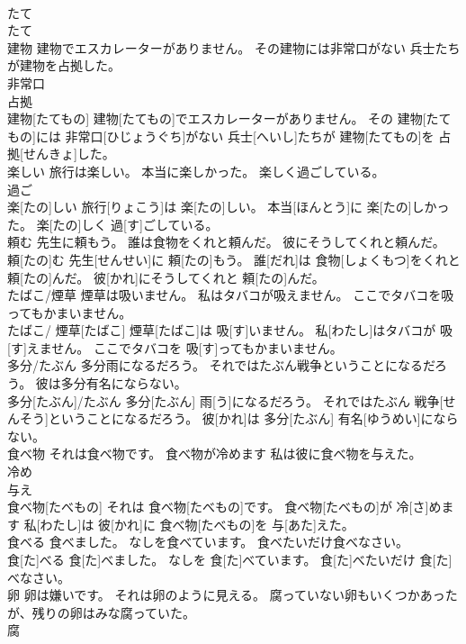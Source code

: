 \documentclass[8pt]{extreport}
\begin{document}
\begin{CJK}{UTF8}{min}
\\	たて	
\\	たて
\\	建物 建物でエスカレーターがありません。 その建物には非常口がない 兵士たちが建物を占拠した。	
\\	非常口 
\\	占拠 
\\	建物[たてもの] 建物[たてもの]でエスカレーターがありません。 その 建物[たてもの]には 非常口[ひじょうぐち]がない 兵士[へいし]たちが 建物[たてもの]を 占拠[せんきょ]した。
\\	楽しい 旅行は楽しい。 本当に楽しかった。 楽しく過ごしている。	
\\	過ご 
\\	楽[たの]しい 旅行[りょこう]は 楽[たの]しい。 本当[ほんとう]に 楽[たの]しかった。 楽[たの]しく 過[す]ごしている。
\\	頼む 先生に頼もう。 誰は食物をくれと頼んだ。 彼にそうしてくれと頼んだ。	
\\	頼[たの]む 先生[せんせい]に 頼[たの]もう。 誰[だれ]は 食物[しょくもつ]をくれと 頼[たの]んだ。 彼[かれ]にそうしてくれと 頼[たの]んだ。
\\	たばこ/煙草 煙草は吸いません。 私はタバコが吸えません。 ここでタバコを吸ってもかまいません。	
\\	たばこ/ 煙草[たばこ] 煙草[たばこ]は 吸[す]いません。 私[わたし]はタバコが 吸[す]えません。 ここでタバコを 吸[す]ってもかまいません。
\\	多分/たぶん 多分雨になるだろう。 それではたぶん戦争ということになるだろう。 彼は多分有名にならない。	
\\	多分[たぶん]/たぶん 多分[たぶん] 雨[う]になるだろう。 それではたぶん 戦争[せんそう]ということになるだろう。 彼[かれ]は 多分[たぶん] 有名[ゆうめい]にならない。
\\	食べ物 それは食べ物です。 食べ物が冷めます 私は彼に食べ物を与えた。	
\\	冷め 
\\	与え 
\\	食べ物[たべもの] それは 食べ物[たべもの]です。 食べ物[たべもの]が 冷[さ]めます 私[わたし]は 彼[かれ]に 食べ物[たべもの]を 与[あた]えた。
\\	食べる 食べました。 なしを食べています。 食べたいだけ食べなさい。	
\\	食[た]べる 食[た]べました。 なしを 食[た]べています。 食[た]べたいだけ 食[た]べなさい。
\\	卵 卵は嫌いです。 それは卵のように見える。 腐っていない卵もいくつかあったが、残りの卵はみな腐っていた。	
\\	腐 

\end{CJK}
\end{document}
